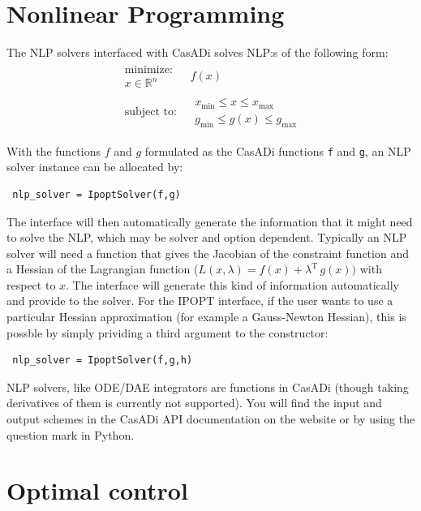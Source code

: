 \documentclass[a4paper,12pt]{book}
\begin{document}
{\chapter{Nonlinear Programming}
The NLP solvers interfaced with CasADi solves NLP:s of the following form:
\begin{equation}
\begin{array}{cc}
\begin{array}{c}
\text{minimize:} \\
x \in \mathbb{R}^n
\end{array}
&
f(x)
\\
\begin{array}{c}
\text{subject to:}
\end{array}
&
\begin{array}{c}
x_{\min} \le x \le x_{\max} \\
g_{\min} \le g(x) \le g_{\max}
\end{array}
\end{array}
\end{equation}

With the functions $f$ and $g$ formulated as the CasADi functions \texttt{f} and \texttt{g}, an NLP solver instance can be allocated by:
\begin{verbatim}
 nlp_solver = IpoptSolver(f,g)
\end{verbatim}

The interface will then automatically generate the information that it might need to solve the NLP, which may be solver and option dependent. Typically an NLP solver will need a function that gives the Jacobian of the constraint function and a Hessian of the Lagrangian function ($L(x,\lambda) = f(x) + \lambda^{\text{T}} \, g(x))$ with respect to $x$. The interface will generate this kind of information automatically and provide to the solver. For the IPOPT interface, if the user wants to use a particular Hessian approximation (for example a Gauss-Newton Hessian), this is possble by simply prividing a third argument to the constructor:
\begin{verbatim}
 nlp_solver = IpoptSolver(f,g,h)
\end{verbatim}

NLP solvers, like ODE/DAE integrators are functions in CasADi (though taking derivatives of them is currently not supported). You will find the input and output schemes in the CasADi API documentation on the website or by using the question mark in Python.

\chapter{Optimal control}

}
\end{document}
